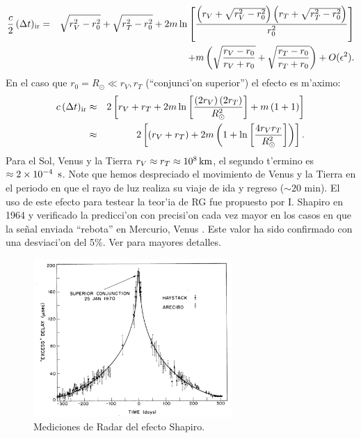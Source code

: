 \begin{eqnarray}
\frac{c}{2}\,(\Delta t)_{\rm ir}&=&\sqrt{r_V^2-r_0^2}+\sqrt{r_T^2-r_0^2}+2m\ln\left[\frac{\left(r_V+\sqrt{r_V^2-r_0^2}\right)\left(r_T+\sqrt{r_T^2-r_0^2}\right)}{r_0^2}\right] \nonumber\\
&&+m\left(\sqrt{\frac{r_V-r_0}{r_V+r_0}}+\sqrt{\frac{r_T-r_0}{r_T+r_0}}\right)+O(\epsilon^2).
\end{eqnarray}
En el caso que $r_0=R_\odot\ll r_V, r_T$ (``conjunci'on superior'') el efecto es m'aximo:
\begin{eqnarray}
c\,(\Delta t)_{\rm ir}&\approx& 2\left[r_V+r_T+2m\ln\left[\frac{\left(2r_V\right)\left(2r_T\right)}{R_\odot^2}\right]+m\left(1+1\right) \right]\\
&\approx&2\left[(r_V+r_T)+2m\left(1+\ln\left[\frac{4r_Vr_T}{R_\odot^2}\right]\right)\right].
\end{eqnarray}
Para el Sol, Venus y la Tierra $r_V\approx r_T\approx 10^8\text{\,km}$, el segundo t'ermino es $\approx 2\times 10^{-4}\text{\, s}$. Note que hemos despreciado el movimiento de Venus y la Tierra en el periodo en que el rayo de luz realiza su viaje de ida y regreso ($\sim 20\text{ min}$). El uso de este efecto para testear la teor'ia de RG fue propuesto por I. Shapiro en 1964 \cite{Shapiro64} y verificado la predicci'on con precisi'on cada vez mayor en los casos en que la se\~nal enviada ``rebota'' en Mercurio, Venus \cite{Shapiro71}. Este valor ha sido confirmado con una desviaci'on del 5\%. Ver \cite{Wei72} para mayores detalles.
\begin{figure}[H]
\begin{center}
\includegraphics[height=6cm]{fig/fig-shapiro-delay-2.pdf}
\caption{Mediciones de Radar del efecto Shapiro.}
\end{center}
\end{figure}

